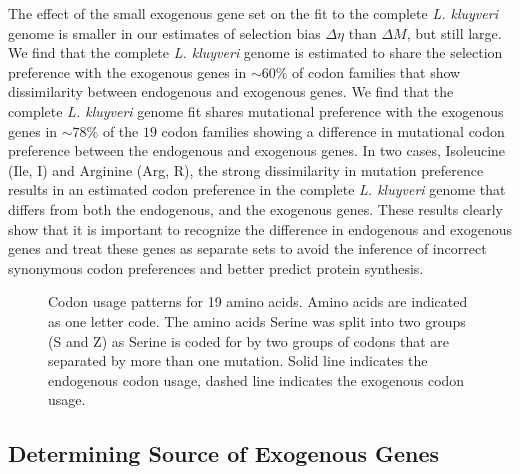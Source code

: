 \documentclass{bmcart}
\def\texttt{[image: ]}
\newcommand{\kluyveri}{\textit{L. kluyveri}\xspace}
\newcommand{\DM}{\ensuremath{{\Delta M}}\xspace}
\newcommand{\DE}{\ensuremath{{\Delta \eta}}\xspace}
\begin{document}
The effect of the small exogenous gene set on the fit to the complete \kluyveri genome is smaller in our estimates of selection bias \DE than \DM, but still large.
We find that the complete \kluyveri genome is estimated to share the selection preference with the exogenous genes in $\sim60\%$ of codon families that show dissimilarity between endogenous and exogenous genes.
We find that the complete \kluyveri genome fit shares mutational preference with the exogenous genes in $\sim78\%$ of the $19$ codon families showing a difference in mutational codon preference between the endogenous and exogenous genes.
In two cases, Isoleucine (Ile, I) and Arginine (Arg, R), the strong dissimilarity in mutation preference results in an estimated codon preference in the complete \kluyveri genome that differs from both the endogenous, and the exogenous genes.
These results clearly show that it is important to recognize the difference in endogenous and exogenous genes and treat these genes as separate sets to avoid the inference of incorrect synonymous codon preferences and better predict protein synthesis.


\begin{figure}
     \centering
	\caption{Codon usage patterns for 19 amino acids. Amino acids are indicated as one letter code. 
	The amino acids Serine was split into two groups (S and Z) as Serine is coded for by two groups of codons that are separated by more than one mutation.
	Solid line indicates the endogenous codon usage, dashed line indicates the exogenous codon usage.}
	\label{fig:cub_endo_exo}
\end{figure}



\subsection*{Determining Source of Exogenous Genes}
\end{document}
